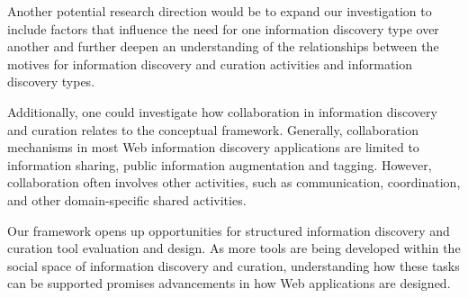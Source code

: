 \documentclass{sigchi}
\begin{document}
Another potential research direction would be to expand our investigation to include factors that influence the need for one information discovery type over another and further deepen an understanding of the relationships between the motives for information discovery and curation activities and information discovery types. 

Additionally, one could investigate how collaboration in information discovery and curation relates to the conceptual framework. Generally, collaboration mechanisms in most Web information discovery applications are limited to information sharing, public information augmentation and tagging. However, collaboration often involves other activities, such as communication, coordination, and other domain-specific shared activities.

Our framework opens up opportunities for structured information discovery and curation tool evaluation and design. As more tools are being developed within the social space of information discovery and curation, understanding how these tasks can be supported promises advancements in how Web applications are designed.


%
%
%
%
%
\balance{}



\end{document}
